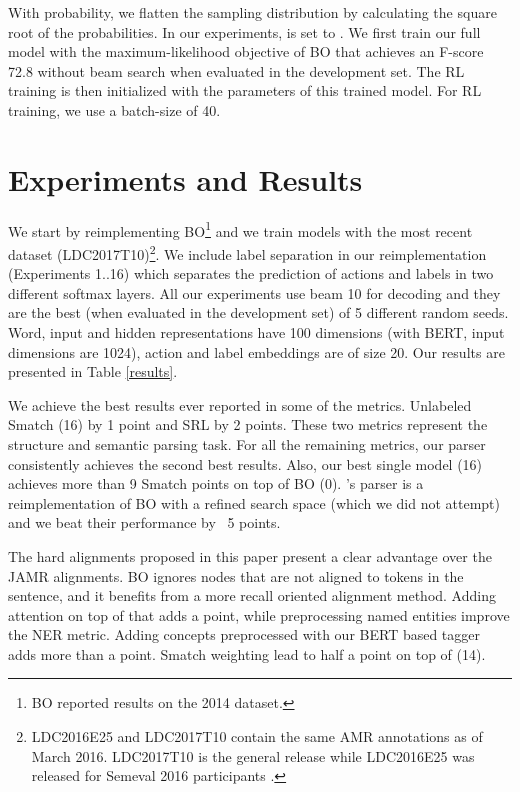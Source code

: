 \documentclass[11pt,a4paper]{article}
\begin{document}
With  probability, we flatten the sampling distribution by calculating the square root of the probabilities. In our experiments,  is set to . We first train our full model with the  maximum-likelihood objective of BO that achieves an F-score 72.8 without beam search when evaluated in the development set. The RL training is then initialized with the parameters of this trained model. For RL training, we use a batch-size of 40. 

\section{Experiments and Results} \label{sec-results}

We start by reimplementing BO\footnote{BO reported results on the 2014 dataset.} and we train models with the most recent dataset (LDC2017T10)\footnote{LDC2016E25 and LDC2017T10 contain the same AMR annotations as of March 2016. LDC2017T10 is the general release while LDC2016E25 was released for Semeval 2016 participants \cite{may2016semeval}.}. We include label separation in our reimplementation (Experiments 1..16) which separates the prediction of actions and labels in two different softmax layers. All our experiments use beam 10 for decoding and they are the best (when evaluated in the development set) of 5 different random seeds. Word, input and hidden representations have 100 dimensions (with BERT, input dimensions are 1024), action and label embeddings are of size 20. Our results are presented in Table \ref{results}.

We achieve the best results ever reported in some of the metrics. Unlabeled Smatch (16) by 1 point and SRL by 2 points. These two metrics represent the structure and semantic parsing task. For all the remaining metrics, our parser consistently achieves the second best results. Also, our best single model (16) achieves more than 9 Smatch points on top of BO (0). 's parser is a reimplementation of BO with a refined search space (which we did not attempt) and we beat their performance by ~5 points. 

The hard alignments proposed in this paper present a clear advantage over the JAMR alignments. BO ignores nodes that are not aligned to tokens in the sentence, and it benefits from a more recall oriented alignment method. Adding attention on top of that adds a point, while preprocessing named entities improve the NER metric. Adding concepts preprocessed with our BERT based tagger adds more than a point. Smatch weighting lead to half a point on top of (14). 
\end{document}
